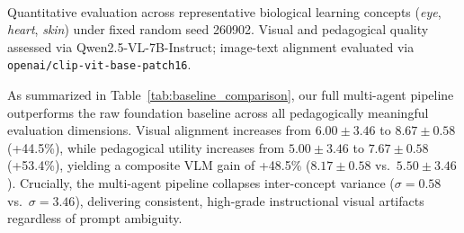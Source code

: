 \documentclass[conference]{IEEEtran}
\begin{document}
\begin{table}[t]
\caption{End-to-End Baseline Comparison: Standalone Raw FLUX.1-dev vs. Our Full Multi-Agent Pipeline}
\label{tab:baseline_comparison}
\centering
{}
\\[2pt]
\footnotesize Quantitative evaluation across representative biological learning concepts (\textit{eye}, \textit{heart}, \textit{skin}) under fixed random seed 260902. Visual and pedagogical quality assessed via Qwen2.5-VL-7B-Instruct; image-text alignment evaluated via \texttt{openai/clip-vit-base-patch16}.
\end{table}

As summarized in Table~\ref{tab:baseline_comparison}, our full multi-agent pipeline outperforms the raw foundation baseline across all pedagogically meaningful evaluation dimensions. Visual alignment increases from $6.00 \pm 3.46$ to $8.67 \pm 0.58$ (+44.5\%), while pedagogical utility increases from $5.00 \pm 3.46$ to $7.67 \pm 0.58$ (+53.4\%), yielding a composite VLM gain of +48.5\% ($8.17 \pm 0.58$ vs.\ $5.50 \pm 3.46$). Crucially, the multi-agent pipeline collapses inter-concept variance ($\sigma=0.58$ vs.\ $\sigma=3.46$), delivering consistent, high-grade instructional visual artifacts regardless of prompt ambiguity.
\end{document}
